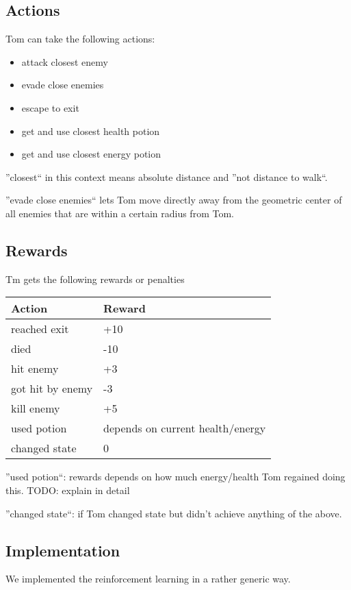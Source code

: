 \documentclass[a4paper,10pt]{scrartcl}
\begin{document}
\subsection{Actions}
Tom can take the following actions:
\begin{itemize}
 \item attack closest enemy
 \item evade close enemies
 \item escape to exit
 \item get and use closest health potion
 \item get and use closest energy potion
\end{itemize}

''closest`` in this context means absolute distance and ''not distance to walk``. \par

''evade close enemies`` lets Tom move directly away from the geometric center of all enemies that are within a certain radius from Tom.

\subsection{Rewards}
Tm gets the following rewards or penalties
\begin{center}
\begin{tabular}{l|l}
Action & Reward \\
\hline
reached exit & +10 \\
died & -10 \\
hit enemy & +3 \\
got hit by enemy & -3 \\
kill enemy & +5 \\
used potion & depends on current health/energy \\
changed state & 0
\end{tabular}
\end{center}

''used potion``: rewards depends on how much energy/health Tom regained doing this. TODO: explain in detail \par
''changed state``: if Tom changed state but didn't achieve anything of the above.

\subsection{Implementation}
We implemented the reinforcement learning in a rather generic way. \par
\end{document}
